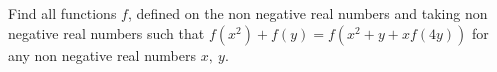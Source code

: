 Find all functions $ f$, defined on the non negative real numbers and taking non negative real numbers such that $ f(x^2)+f(y)=f(x^2+y+xf(4y))$ for any non negative real numbers $ x,\ y$.
